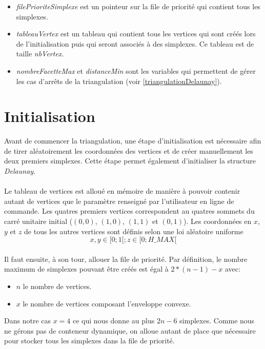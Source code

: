 \documentclass{article}
\begin{document}
	\begin{itemize}
	\item \textit{filePrioriteSimplexe} est un pointeur sur la file de priorité qui contient tous les simplexes.
	\item \textit{tableauVertex} est un tableau qui contient tous les vertices qui sont créés lors de l'initialisation puis qui seront associés à des simplexes. Ce tableau est de taille \textit{nbVertex}.
	\item \textit{nombreFacetteMax} et \textit{distanceMin} sont les variables qui permettent de gérer les cas d'arrêts de la triangulation (voir \ref{triangulationDelaunay}).
	\end{itemize}

\section{Initialisation}	
    Avant de commencer la triangulation, une étape d'initialisation est nécessaire afin de tirer aléatoirement les coordonnées des vertices et de créer manuellement les deux premiers simplexes. Cette étape permet également d'initialiser la structure \textit{Delaunay}.
    
    \paragraph{}
    Le tableau de vertices est alloué en mémoire de manière à pouvoir contenir autant de vertices que le paramètre renseigné par l'utilisateur en ligne de commande. 
    Les quatres premiers vertices correspondent au quatres sommets du carré unitaire initial ($(0,0)$, $(1,0)$, $(1,1)$ et $(0,1)$). Les coordonnées en $x$, $y$ et $z$ de tous les autres vertices sont définis selon une loi aléatoire uniforme \[x,y \in[0;1[ ; z \in[0; \textit{H\_MAX}[\]
    
    \paragraph{}
    Il faut ensuite, à son tour, allouer la file de priorité. Par définition, le nombre maximum de simplexes pouvant être créés est égal à $2*(n - 1) - x$ avec:
        \begin{itemize}
        \item $n$ le nombre de vertices.
        \item $x$ le nombre de vertices composant l'enveloppe convexe.
        \end{itemize}
    Dans notre cas $x = 4$ ce qui nous donne au plus $2n - 6$ simplexes. Comme nous ne gérons pas de conteneur dynamique, on alloue autant de place que nécessaire pour stocker tous les simplexes dans la file de priorité.
    
\end{document}
